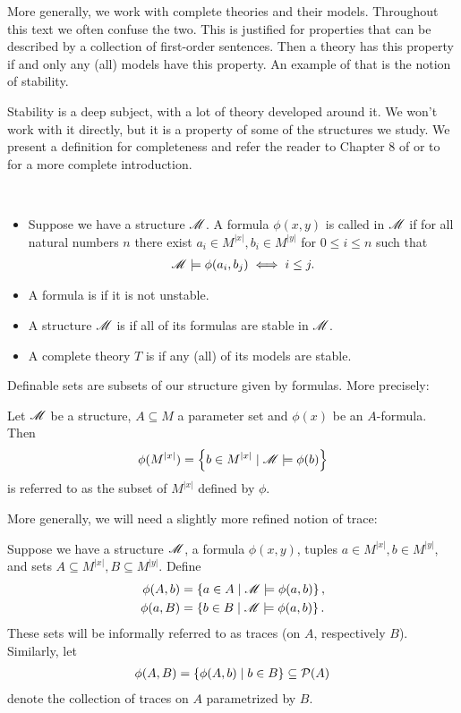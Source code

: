 More generally, we work with complete theories and their models.
Throughout this text we often confuse the two.
This is justified for properties that can be described by a collection of first-order sentences.
Then a theory has this property if and only any (all) models have this property.
An example of that is the notion of stability.

Stability is a deep subject, with a lot of theory developed around it.
We won't work with it directly, but it is a property of some of the structures we study.
We present a definition for completeness and refer the reader to Chapter 8 of \cite{tent} or to \cite{pillay} for a more complete introduction.

\begin{Definition} \ 
  \begin{itemize}
  \item Suppose we have a structure $\mathscr M$.
    A formula $\phi(x,y)$ is called  in $\mathscr M$ if for all natural numbers $n$
    there exist $a_i \in M^{|x|}, b_i \in M^{|y|}$ for $0 \leq i \leq n$ such that
    \begin{align*}
      \mathscr M \models \phi(a_i, b_j) \iff i \leq j.
    \end{align*}
  \item A formula is  if it is not unstable.
  \item A structure $\mathscr M$ is  if all of its formulas are stable in $\mathscr M$.
  \item A complete theory $T$ is \defn{stable} if any (all) of its models are stable.
  \end{itemize}
\end{Definition}

Definable sets are subsets of our structure given by formulas.
More precisely:
\begin{Definition}
  Let $\mathscr M$ be a structure, $A \subseteq M$ a parameter set and  $\phi(x)$ be an $A$-formula.
  Then 
  \begin{align*}
    \phi(M^{|x|}) = \left\{b \in M^{|x|} \mid \mathscr M \models \phi(b)\right\}
  \end{align*}
  is referred to as the  subset of $M^{|x|}$ defined by $\phi$.
\end{Definition}

More generally, we will need a slightly more refined notion of trace:
\begin{Definition}
  Suppose we have a structure $\mathscr M$, a formula $\phi(x, y)$, tuples $a \in M^{|x|}, b \in M^{|y|}$, and
  sets $A \subseteq M^{|x|}, B \subseteq M^{|y|}$. 
  Define
  \begin{align*}
    \phi(A, b) &= \left\{a \in A \mid \mathscr M \models \phi(a,b)\right\}, \\
    \phi(a, B) &= \left\{b \in B \mid \mathscr M \models \phi(a,b)\right\}.
  \end{align*}
  These sets will be informally referred to as traces (on $A$, respectively $B$).
  Similarly, let
  \begin{align*}
    \phi(A, B) = \left\{\phi(A, b) \mid b \in B\right\} \subseteq \mathcal P(A)
  \end{align*}
  denote the collection of traces on $A$ parametrized by $B$.
\end{Definition}

